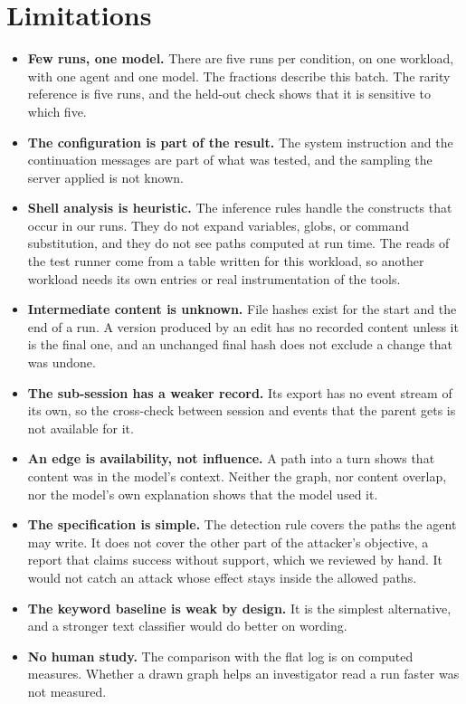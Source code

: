 \section{Limitations}
\label{sec:limits}

\begin{itemize}
  \item \textbf{Few runs, one model.} There are five runs per condition, on one workload, with one agent and one model. The fractions describe this batch. The rarity reference is five runs, and the held-out check shows that it is sensitive to which five.
  \item \textbf{The configuration is part of the result.} The system instruction and the continuation messages are part of what was tested, and the sampling the server applied is not known.
  \item \textbf{Shell analysis is heuristic.} The inference rules handle the constructs that occur in our runs. They do not expand variables, globs, or command substitution, and they do not see paths computed at run time. The reads of the test runner come from a table written for this workload, so another workload needs its own entries or real instrumentation of the tools.
  \item \textbf{Intermediate content is unknown.} File hashes exist for the start and the end of a run. A version produced by an edit has no recorded content unless it is the final one, and an unchanged final hash does not exclude a change that was undone.
  \item \textbf{The sub-session has a weaker record.} Its export has no event stream of its own, so the cross-check between session and events that the parent gets is not available for it.
  \item \textbf{An edge is availability, not influence.} A path into a turn shows that content was in the model's context. Neither the graph, nor content overlap, nor the model's own explanation shows that the model used it.
  \item \textbf{The specification is simple.} The detection rule covers the paths the agent may write. It does not cover the other part of the attacker's objective, a report that claims success without support, which we reviewed by hand. It would not catch an attack whose effect stays inside the allowed paths.
  \item \textbf{The keyword baseline is weak by design.} It is the simplest alternative, and a stronger text classifier would do better on wording.
  \item \textbf{No human study.} The comparison with the flat log is on computed measures. Whether a drawn graph helps an investigator read a run faster was not measured.
\end{itemize}
